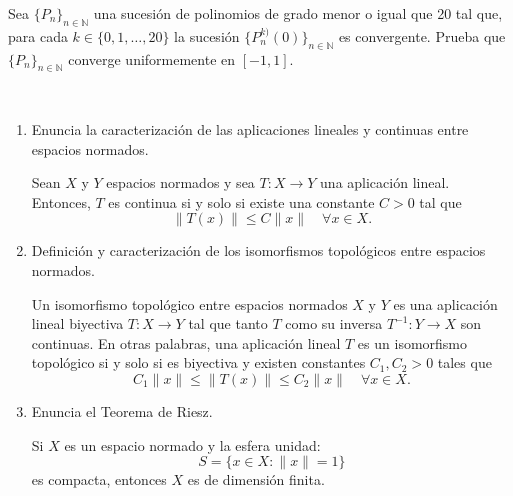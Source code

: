 \documentclass[12pt]{article}
\begin{document}
    \begin{ejercicio}[3 puntos]
        Sea $\{P_n\}_{n\in \mathbb{N}}$ una sucesión de polinomios de grado menor o igual que 20 tal que, para cada $k \in \{0,1,\ldots,20\}$ la sucesión $\{P_n^{k)}(0)\}_{n\in \mathbb{N}}$ es convergente. Prueba que $\{P_n\}_{n\in \mathbb{N}}$ converge uniformemente en $[-1,1]$.
    \end{ejercicio}


    \newpage
    \setcounter{ejercicio}{0} %

    \begin{ejercicio}[3 puntos]~
        \begin{enumerate}[label=\alph*)]
            \item Enuncia la caracterización de las aplicaciones lineales y continuas entre espacios normados.
            
            Sean $X$ y $Y$ espacios normados y sea $T:X\to Y$ una aplicación lineal. Entonces, $T$ es continua si y solo si existe una constante $C>0$ tal que
            \begin{equation*}
                \|T(x)\|\leq C\|x\| \quad \forall x\in X.
            \end{equation*}
            \item Definición y caracterización de los isomorfismos topológicos entre espacios normados.
            
            Un isomorfismo topológico entre espacios normados $X$ y $Y$ es una aplicación lineal biyectiva $T:X\to Y$ tal que tanto $T$ como su inversa $T^{-1}:Y\to X$ son continuas. En otras palabras, una aplicación lineal $T$ es un isomorfismo topológico si y solo si es biyectiva y existen constantes $C_1, C_2 > 0$ tales que
            \begin{equation*}
                C_1\|x\| \leq \|T(x)\| \leq C_2\|x\| \quad \forall x\in X.
            \end{equation*}
            \item Enuncia el Teorema de Riesz.
            
            Si $X$ es un espacio normado y la esfera unidad:
            \begin{equation*}
                S = \{x\in X : \|x\|=1\}
            \end{equation*}
            es compacta, entonces $X$ es de dimensión finita.
        \end{enumerate}
    \end{ejercicio}
\end{document}
